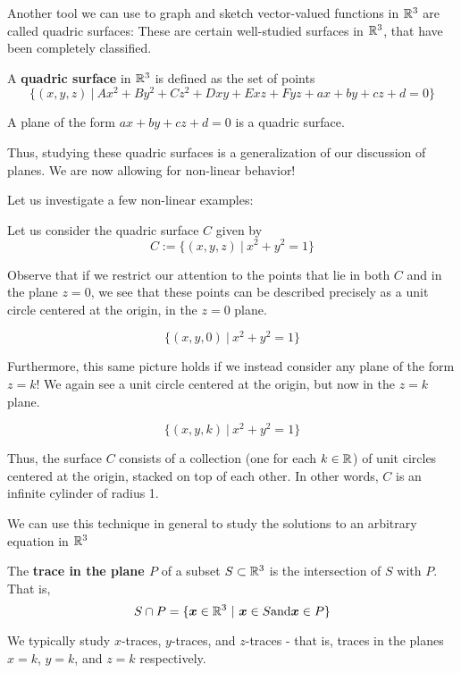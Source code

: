 Another tool we can use to graph and sketch vector-valued functions in $\mathbb{R}^3$ are called quadric surfaces:  These are certain well-studied surfaces in $\mathbb{R}^3$, that have been completely classified.


\begin{definition}
A \textbf{quadric surface} in $\mathbb{R}^3$ is defined as the set of points $$\{ (x, y, z) \ | \ Ax^2 + By^2 + Cz^2 + Dxy + Exz + Fyz + ax + by + cz + d = 0\}$$
\end{definition}

\begin{example}
A plane of the form $ax + by + cz + d = 0$ is a quadric surface.
\end{example}

Thus, studying these quadric surfaces is a generalization of our discussion of planes.  We are now allowing for non-linear behavior!


Let us investigate a few non-linear examples:

\begin{example}
Let us consider the quadric surface $C$ given by  $$C := \{ (x, y, z) \ | \ x^2 + y^2 = 1\}$$

Observe that if we restrict our attention to the points that lie in both $C$ and in the plane $z = 0$, we see that these points can be described precisely as a unit circle centered at the origin, in the $z=0$ plane.

$$\{ (x, y, 0) \ | \ x^2 + y^2 = 1\}$$

Furthermore, this same picture holds if we instead consider any plane of the form $z=k$!  We again see a unit circle centered at the origin, but now in the $z=k$ plane.

$$\{ (x, y, k) \ | \ x^2 + y^2 = 1\}$$

Thus, the surface $C$ consists of a collection (one for each $k \in \mathbb{R}$) of unit circles centered at the origin, stacked on top of each other.  In other words, $C$ is an infinite cylinder of radius 1.
\end{example}


We can use this technique in general to study the solutions to an arbitrary equation in $\mathbb{R}^3$ 

\begin{definition}
    The \textbf{trace in the plane $P$} of a subset $S \subset \mathbb{R}^3$ is the intersection of $S$ with $P$.  That is, 
    $$S \cap P = \{\bm{x} \in \R^3 \ | \ \bm{x} \in S \textnormal{and} \bm{x} \in P\}$$
    
    We typically study $x$-traces, $y$-traces, and $z$-traces - that is, traces in the planes $x=k$, $y=k$, and $z=k$ respectively.
    
\end{definition}

